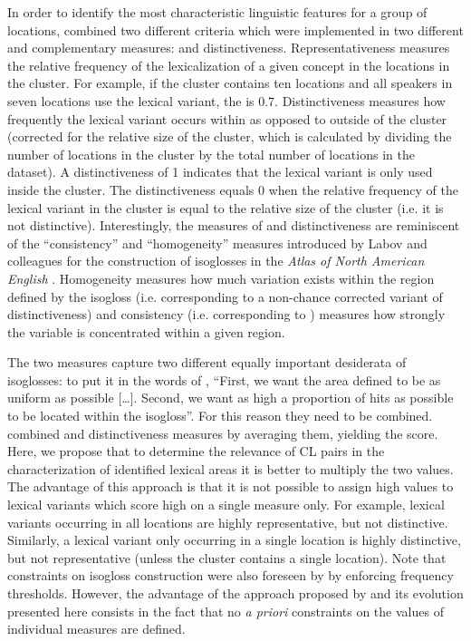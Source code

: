\documentclass[output=paper]{LSP/langsci}
\begin{document}
In order to identify the most characteristic linguistic features for a group of locations, \citet{wieling_bipartite_2011} combined two different criteria which were implemented in two different and complementary measures:  and distinctiveness. Representativeness measures the relative frequency of the lexicalization of a given concept in the locations in the cluster. For example, if the cluster contains ten locations and all speakers in seven locations use the lexical variant, the  is 0.7. Distinctiveness measures how frequently the lexical variant occurs within as opposed to outside of the cluster (corrected for the relative size of the cluster, which is calculated by dividing the number of locations in the cluster by the total number of locations in the dataset). A distinctiveness of 1 indicates that the lexical variant is only used inside the cluster. The distinctiveness equals 0 when the relative frequency of the lexical variant in the cluster is equal to the relative size of the cluster (i.e. it is not distinctive). Interestingly, the measures of  and distinctiveness are reminiscent of the “consistency” and “homogeneity” measures introduced by Labov and colleagues for the construction of isoglosses in the \textit{Atlas of North American English} \citep{labov_atlas_2006-1}. Homogeneity measures how much variation exists within the region defined by the isogloss (i.e. corresponding to a non-chance corrected variant of distinctiveness) and consistency (i.e. corresponding to ) measures how strongly the variable is concentrated within a given region.

The two measures capture two different equally important desiderata of isoglosses: to put it in the words of \citet{labov_atlas_2006-1}, “First, we want the area defined to be as uniform as possible […]. Second, we want as high a proportion of hits as possible to be located within the isogloss”. For this reason they need to be combined. \citet{wieling_bipartite_2011} combined  and distinctiveness measures by averaging them, yielding the  score. Here, we propose that to determine the relevance of CL pairs in the characterization of identified lexical areas it is better to multiply the two values. The advantage of this approach is that it is not possible to assign high  values to lexical variants which score high on a single measure only. For example, lexical variants occurring in all locations are highly representative, but not distinctive. Similarly, a lexical variant only occurring in a single location is highly distinctive, but not representative (unless the cluster contains a single location). Note that constraints on isogloss construction were also foreseen by \citet{labov_atlas_2006-1} by enforcing frequency thresholds. However, the advantage of the approach proposed by \citet{wieling_bipartite_2011} and its evolution presented here consists in the fact that no \textit{a priori} constraints on the values of individual measures are defined.
\end{document}
